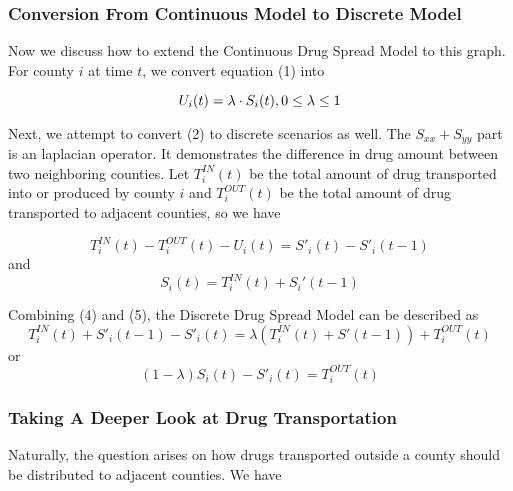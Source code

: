 \subsubsection{Conversion From Continuous Model to Discrete Model}
Now we discuss how to extend the Continuous Drug Spread Model to this graph. For county $i$ at time $t$, we convert equation (1) into

\begin{equation}
U_i(t) = \lambda\cdot S_i(t), 0\leq \lambda \leq 1 \\
\end{equation}

Next, we attempt to convert (2) to discrete scenarios as well. The $S_{xx}+S_{yy}$ part is an laplacian operator. It demonstrates the difference in drug amount between two neighboring counties.  Let $T^{IN}_i(t)$ be the total amount of drug transported into or produced by county $i$ and $T^{OUT}_i(t)$ be the total amount of drug transported to adjacent counties, so we have

\begin{equation}
T^{IN}_i(t)-T^{OUT}_i(t) - U_i(t)= S'_i(t)-S'_i(t-1)
\end{equation}
and 
\begin{equation}
S_i(t) = T^{IN}_i(t) + S_i'(t-1)
\end{equation}

Combining (4) and (5), the Discrete Drug Spread Model can be described as
\begin{equation}
T^{IN}_i(t) + S'_i(t-1)-S'_i(t) = \lambda(T^{IN}_i(t) + S'(t-1))+ T^{OUT}_i(t)
\end{equation}
or 
\begin{equation}
(1-\lambda)S_i(t)-S'_i(t) = T^{OUT}_i(t)
\end{equation}

\begin{comment}
\textit{
In the previous subsection, we pointed out that $\lambda$ is a socio-economic factor impling the relationship between drug usage and drug storage. In the discrete scenario, we can describe it as
}
\begin{equation}
\lambda = \frac{U_i(t)}{S_i(t)} = \frac{S_i(t) -\sum_{j\in N_i}S_j(t)}{S_i(t)}
\end{equation}
\end{comment}
\subsubsection{Taking A Deeper Look at Drug Transportation}
Naturally, the question arises on how drugs transported outside a county should be distributed to adjacent counties. We have

